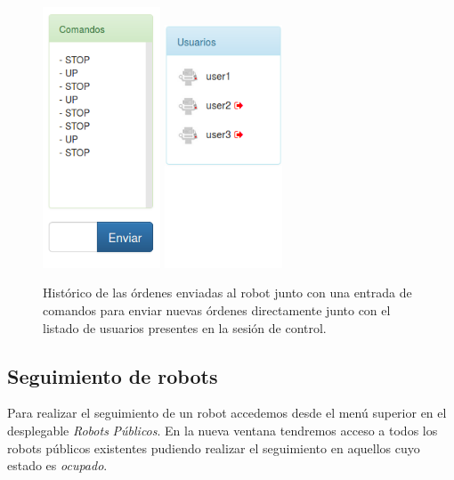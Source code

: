 \begin{figure}[H]
    \centering
    \includegraphics[width=3.5cm]{imagenes/manual-usuario/panel-comandos.png}
    \qquad
    \includegraphics[width=3.5cm]{imagenes/manual-usuario/listado-usuarios.png}
    \caption{Histórico de las órdenes enviadas al robot junto con una entrada de comandos para enviar nuevas órdenes directamente junto con el listado de usuarios presentes en la sesión de control. }%
    \label{fig:http-request}%
\end{figure}


\subsection{ Seguimiento de robots }
\label{sec:visita-robot}

Para realizar el seguimiento de un robot accedemos desde el menú superior en el desplegable \emph{Robots} \textrightarrow \enspace \emph{Públicos}. En la nueva ventana
tendremos acceso a todos los robots públicos existentes pudiendo realizar el seguimiento en aquellos cuyo estado es \emph{ocupado}.

